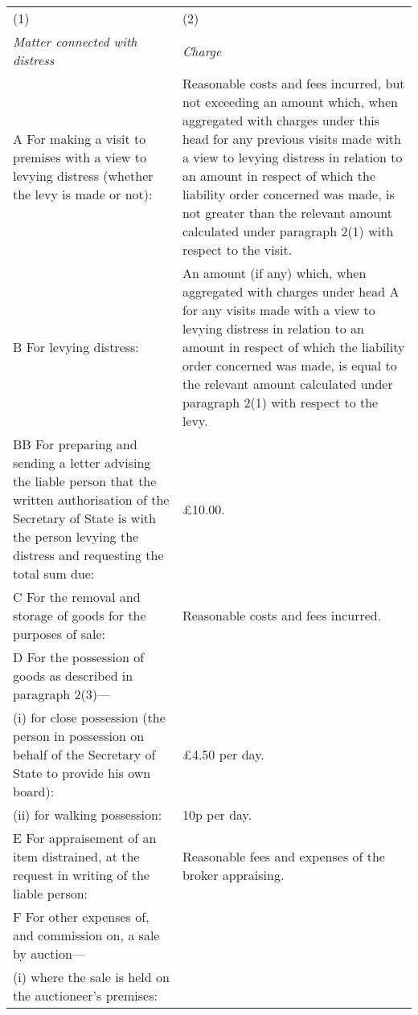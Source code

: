 \documentclass[a4paper]{article}
\begin{document}
\noindent
\begin{longtable}{p{135.43257pt}p{185.55615pt}}
\hline
(1)&(2)\\
\itshape Matter connected with distress&\itshape Charge\\
\hline
\endhead
\hline
\endlastfoot
A {} For making a visit to premises with a view to levying distress (whether the levy is made or not):&
Reasonable costs and fees incurred, but not exceeding an amount which, when aggregated with charges under this head for any previous visits made with a view to levying distress in relation to an amount in respect of which the liability order concerned was made, is not greater than the relevant amount calculated under paragraph 2(1) with respect to the visit.\\
B {} For levying distress:&
An amount (if any) which, when aggregated with charges under head A for any visits made with a view to levying distress in relation to an amount in respect of which the liability order concerned was made, is equal to the relevant amount calculated under paragraph 2(1) with respect to the levy.\\
BB {} For preparing and sending a letter advising the liable person that the written authorisation of the Secretary of State is with the person levying the distress and requesting the total sum due: & £10.00.\\
C {} For the removal and storage of goods for the purposes of sale:&
Reasonable costs and fees incurred.\\
D {}  For the possession of goods as described in paragraph 2(3)—\\
\hspace{12pt}(i) for close possession (the person in possession on behalf of the Secretary of State to provide his own board):&
£4.50 per day.\\
\hspace{12pt}(ii) for walking possession:&
10p per day.\\ %
E {} For appraisement of an item distrained, at the request in writing of the liable person:&
Reasonable fees and expenses of the broker appraising.\\
F {} For other expenses of, and commission on, a sale by auction—\\
\hspace{12pt}(i) where the sale is held on the auctioneer’s premises:&

\end{longtable}
\end{document}
